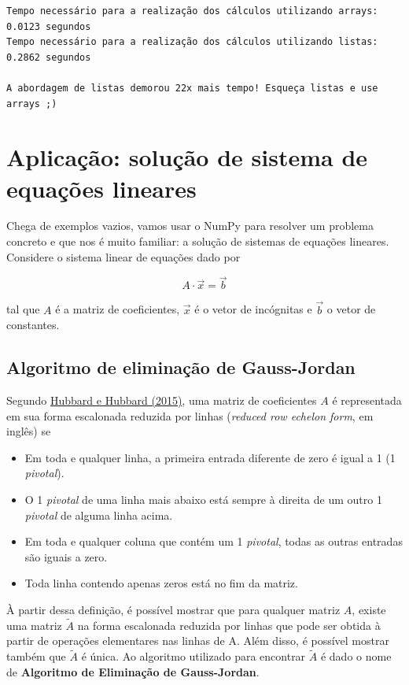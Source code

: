 \documentclass[
  brazilian,
  letterpaper,
  DIV=11,
  numbers=noendperiod]{scrreprt}
\providecommand{\tightlist}{%
  \setlength{\itemsep}{0pt}\setlength{\parskip}{0pt}}
\begin{document}
\begin{verbatim}
Tempo necessário para a realização dos cálculos utilizando arrays: 0.0123 segundos
Tempo necessário para a realização dos cálculos utilizando listas: 0.2862 segundos

A abordagem de listas demorou 22x mais tempo! Esqueça listas e use arrays ;)
\end{verbatim}

\section{Aplicação: solução de sistema de equações
lineares}\label{aplicauxe7uxe3o-soluuxe7uxe3o-de-sistema-de-equauxe7uxf5es-lineares}

Chega de exemplos vazios, vamos usar o NumPy para resolver um problema
concreto e que nos é muito familiar: a solução de sistemas de equações
lineares. Considere o sistema linear de equações dado por

\[ A\cdot \vec{x} = \vec{b} \]

tal que \(A\) é a matriz de coeficientes, \(\vec{x}\) é o vetor de
incógnitas e \(\vec{b}\) o vetor de constantes.

\subsection{Algoritmo de eliminação de
Gauss-Jordan}\label{algoritmo-de-eliminauxe7uxe3o-de-gauss-jordan}

Segundo
\href{https://matrixeditions.com/5thUnifiedApproach.html}{Hubbard e
Hubbard (2015)}, uma matriz de coeficientes \(A\) é representada em sua
forma escalonada reduzida por linhas (\emph{reduced row echelon form},
em inglês) se

\begin{itemize}
\tightlist
\item
  Em toda e qualquer linha, a primeira entrada diferente de zero é igual
  a 1 (1 \emph{pivotal}).
\item
  O 1 \emph{pivotal} de uma linha mais abaixo está sempre à direita de
  um outro 1 \emph{pivotal} de alguma linha acima.
\item
  Em toda e qualquer coluna que contém um 1 \emph{pivotal}, todas as
  outras entradas são iguais a zero.
\item
  Toda linha contendo apenas zeros está no fim da matriz.
\end{itemize}

À partir dessa definição, é possível mostrar que para qualquer matriz
\(A\), existe uma matriz \(\tilde{A}\) na forma escalonada reduzida por
linhas que pode ser obtida à partir de operações elementares nas linhas
de A. Além disso, é possível mostrar também que \(\tilde{A}\) é única.
Ao algoritmo utilizado para encontrar \(\tilde{A}\) é dado o nome de
\textbf{Algoritmo de Eliminação de Gauss-Jordan}.
\end{document}
